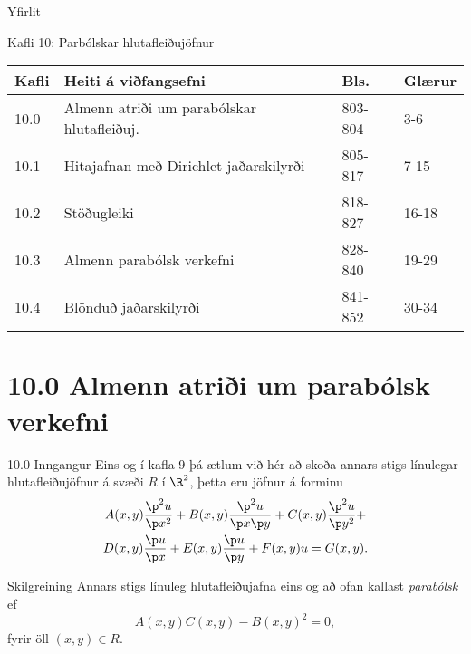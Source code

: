 \date{13.~og 18.~apríl, 2012}



\begin{frame}
	\maketitle
\end{frame}

\begin{frame}{Yfirlit}
\begin{block}{Kafli 10: Parbólskar hlutafleiðujöfnur}
\begin{center}
\begin{tabular}{|l|l|l|l|}\hline
Kafli &Heiti á viðfangsefni & Bls. & Glærur\\
\hline
10.0 & Almenn atriði um parabólskar hlutafleiðuj. & 803-804 & 3-6\\
10.1 & Hitajafnan með Dirichlet-jaðarskilyrði & 805-817 & 7-15 \\
10.2 & Stöðugleiki & 818-827 & 16-18 \\
10.3 & Almenn parabólsk verkefni & 828-840 & 19-29\\
10.4 & Blönduð jaðarskilyrði & 841-852 & 30-34\\ \hline
\end{tabular}
\end{center}
\end{block}
\end{frame}

\section*{10.0 Almenn atriði um parabólsk verkefni}

\begin{frame}{10.0 Inngangur}
Eins og í kafla 9 þá ætlum við hér að skoða annars stigs línulegar 
hlutafleiðujöfnur á svæði $R$ í $\R^2$, \pause þetta eru jöfnur á forminu
\begin{multline}
A(x,y)\frac{\p^2 u}{\p x^2} + B(x,y)\frac{\p^2 u}{\p x\p y} + C(x,y)\frac{\p^2 u}{\p y^2} +\\
D(x,y)\frac{\p u}{\p x} + E(x,y)\frac{\p u}{\p y} + F(x,y)u = G(x,y).
\end{multline}
\begin{block}{Skilgreining}
 Annars stigs línuleg hlutafleiðujafna eins og að ofan kallast \emph{parabólsk}
 ef 
 $$
  A(x,y)C(x,y) - B(x,y)^2 = 0,
 $$
 fyrir öll $(x,y) \in R$.
\end{block}

\end{frame}


